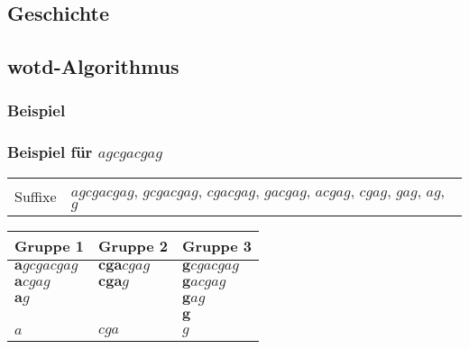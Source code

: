 \documentclass{beamer}
\begin{document}
\subsection{Geschichte}


\subsection{wotd-Algorithmus}

\subsubsection{Beispiel}

\begin{frame}
\frametitle{Beispiel für $agcgacgag$}
\begin{tabularx}{\textwidth}{L X}
    Suffixe &  $agcgacgag$, $gcgacgag$, $cgacgag$, $gacgag$, $acgag$, $cgag$, $gag$, $ag$, $g$
\end{tabularx}
\begin{table}
    \begin{tabular}{l l l}
        \toprule
        Gruppe 1                 & Gruppe 2               & Gruppe 3                \\
        \midrule 
        $\boldsymbol{a}gcgacgag$ & $\boldsymbol{cga}cgag$ & $\boldsymbol{g}cgacgag$ \\
        $\boldsymbol{a}cgag$     & $\boldsymbol{cga}g$    & $\boldsymbol{g}acgag$   \\
        $\boldsymbol{a}g$        &                        & $\boldsymbol{g}ag$      \\
                                 &                        & $\boldsymbol{g}$        \\
        \midrule
        $a$                      & $cga$                  & $g$                     \\
        \bottomrule
    \end{tabular}
\end{table}
\end{frame}
\end{document}
